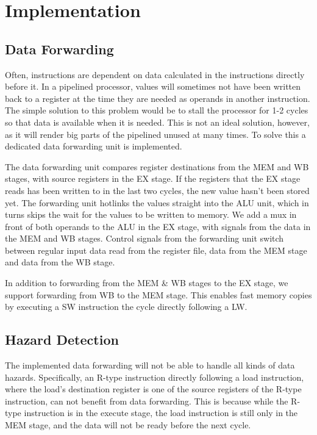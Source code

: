 \section{Implementation}

\subsection{Data Forwarding}
Often, instructions are dependent on data calculated in the instructions directly before it.
In a pipelined processor, values will sometimes not have been written back to a register at the time they are needed as operands in another instruction.
The simple solution to this problem would be to stall the processor for 1-2 cycles so that data is available when it is needed.
This is not an ideal solution, however, as it will render big parts of the pipelined unused at many times.
To solve this a dedicated data forwarding unit is implemented.

The data forwarding unit compares register destinations from the MEM and WB stages, with source registers in the EX stage.
If the registers that the EX stage reads has been written to in the last two cycles, the new value hasn't been stored yet.
The forwarding unit hotlinks the values straight into the ALU unit, which in turns skips the wait for the values to be written to memory.
We add a mux in front of both operands to the ALU in the EX stage, with signals from the data in the MEM and WB stages.
Control signals from the forwarding unit switch between regular input data read from the register file, data from the MEM stage and data from the WB stage.

In addition to forwarding from the MEM \& WB stages to the EX stage, we support forwarding from WB to the MEM stage.
This enables fast memory copies by executing a SW instruction the cycle directly following a LW.

\subsection {Hazard Detection}
The implemented data forwarding will not be able to handle all kinds of data hazards.
Specifically, an R-type instruction directly following a load instruction, where the load's destination register is one of the source registers of the R-type instruction, can not benefit from data forwarding.
This is because while the R-type instruction is in the execute stage, the load instruction is still only in the MEM stage, and the data will not be ready before the next cycle.

